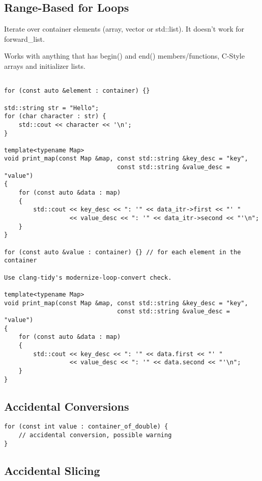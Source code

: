 \subsection{Range-Based for Loops}


Iterate over container elements (array, vector or std::list). It doesn't work for forward\_list.


Works with anything that has begin()
and end() members/functions, C-Style arrays and initializer lists.

\begin{verbatim}

for (const auto &element : container) {}

std::string str = "Hello";
for (char character : str) {
    std::cout << character << '\n';
}

template<typename Map>
void print_map(const Map &map, const std::string &key_desc = "key",
                               const std::string &value_desc = "value")
{
    for (const auto &data : map)
    {
        std::cout << key_desc << ": '" << data_itr->first << "' "
                  << value_desc << ": '" << data_itr->second << "'\n";
    }
}

for (const auto &value : container) {} // for each element in the container

Use clang-tidy's modernize-loop-convert check.

template<typename Map>
void print_map(const Map &map, const std::string &key_desc = "key",
                               const std::string &value_desc = "value")
{
    for (const auto &data : map)
    {
        std::cout << key_desc << ": '" << data.first << "' "
                  << value_desc << ": '" << data.second << "'\n";
    }
}
\end{verbatim}

\subsection{Accidental Conversions}

\begin{verbatim}
for (const int value : container_of_double) {
    // accidental conversion, possible warning
}
\end{verbatim}

\subsection{Accidental Slicing}

